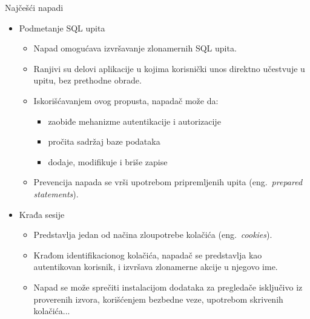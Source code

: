 \documentclass{beamer}
\begin{document}
\begin{frame}{Najčešći napadi}
    \begin{itemize}
        \item Podmetanje SQL upita
        \begin{itemize}
            \item Napad omogućava izvršavanje zlonamernih SQL upita. \pause
            \item Ranjivi su delovi aplikacije u kojima korisnički unos direktno učestvuje u upitu, bez prethodne obrade. \pause
            \item Iskorišćavanjem ovog propusta, napadač može da:
            \begin{itemize}
                \item zaobiđe mehanizme autentikacije i autorizacije \pause
                \item pročita sadržaj baze podataka \pause
                \item dodaje, modifikuje i briše zapise \pause
            \end{itemize}
            \item Prevencija napada se vrši upotrebom pripremljenih upita (eng.~{\em prepared statements}).\pause
        \end{itemize}
        \item Krađa sesije
        \begin{itemize}
            \item Predstavlja jedan od načina zloupotrebe kolačića (eng.~{\em cookies}). \pause
            \item Krađom identifikacionog kolačića, napadač se predstavlja kao autentikovan korisnik, i izvršava zlonamerne akcije u njegovo ime. \pause
            \item Napad se može sprečiti instalacijom dodataka za pregledače isključivo iz proverenih izvora, korišćenjem bezbedne veze, upotrebom skrivenih kolačića...
        \end{itemize}
    \end{itemize}
\end{frame}
\end{document}
